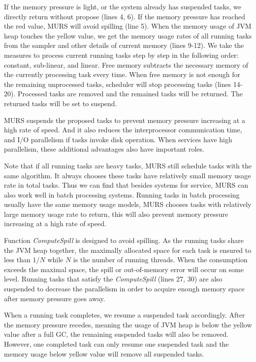 If the memory pressure is light, or the system already has suspended tasks, we directly return without propose (lines 4, 6). If the memory pressure has reached the red value, MURS will avoid spilling (line 5). When the memory usage of JVM heap touches the yellow value, we get the memory usage rates of all running tasks from the sampler and other details of current memory (lines 9-12). We take the measures to process current running tasks step by step in the following order: constant, sub-linear, and linear. Free memory subtracts the necessary memory of the currently processing task every time. When free memory is not enough for the remaining unprocessed tasks, scheduler will stop processing tasks (lines 14-20). Processed tasks are removed and the remained tasks will be returned. The returned tasks will be set to suspend.

MURS suspends the proposed tasks to prevent memory pressure increasing at a high rate of speed. And it also reduces the interprocessor communication time, and I/O parallelism if tasks invoke disk operation. When services have high parallelism, these additional advantages also have important roles.

Note that if all running tasks are heavy tasks, MURS still schedule tasks with the same algorithm. It always chooses these tasks have relatively small memory usage rate in total tasks. Thus we can find that besides systems for service, MURS can also work well in batch processing systems. Running tasks in batch processing usually have the same memory usage models, MURS chooses tasks with relatively large memory usage rate to return, this will also prevent memory pressure increasing at a high rate of speed.

Function \textit{ComputeSpill} is designed to avoid spilling. As the running tasks share the JVM heap together, the maximally allocated space for each task is ensured to less than $1/N$ while $N$ is the number of running threads. When the consumption exceeds the maximal space, the spill or out-of-memory error will occur on some level. Running tasks that satisfy the \textit{ComputeSpill} (lines 27, 30) are also suspended to decrease the parallelism in order to acquire enough memory space after memory pressure goes away.   

When a running task completes, we resume a suspended task accordingly. After the memory pressure recedes, meaning the usage of JVM heap is below the yellow value after a full GC, the remaining suspended tasks will also be removed. However, one completed task can only resume one suspended task and the memory usage below yellow value will remove all suspended tasks.





